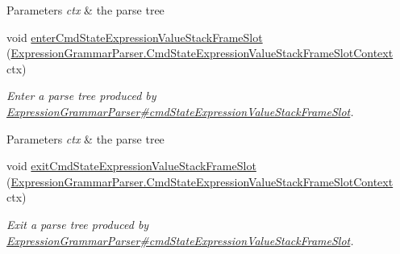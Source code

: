 \begin{DoxyCompactItemize}
\begin{DoxyCompactList}
\begin{DoxyParams}{Parameters}
{\em ctx} & the parse tree\\
\hline
\end{DoxyParams}
 \end{DoxyCompactList}\item 
void \hyperlink{classgov_1_1nasa_1_1jpf_1_1inspector_1_1server_1_1expression_1_1parser_1_1_expression_grammar_base_listener_a40f53b6e3ccedcc4bb7bbce628484466}{enter\+Cmd\+State\+Expression\+Value\+Stack\+Frame\+Slot} (\hyperlink{classgov_1_1nasa_1_1jpf_1_1inspector_1_1server_1_1expression_1_1parser_1_1_expression_grammar_pa53e28d24e840d016fb7c58b2b73008ab}{Expression\+Grammar\+Parser.\+Cmd\+State\+Expression\+Value\+Stack\+Frame\+Slot\+Context} ctx)
\begin{DoxyCompactList}\small\item\em Enter a parse tree produced by \hyperlink{classgov_1_1nasa_1_1jpf_1_1inspector_1_1server_1_1expression_1_1parser_1_1_expression_grammar_parser_a6b064d2ec6f62d4260a820ef3c1864e9}{Expression\+Grammar\+Parser\#cmd\+State\+Expression\+Value\+Stack\+Frame\+Slot}.


\begin{DoxyParams}{Parameters}
{\em ctx} & the parse tree\\
\hline
\end{DoxyParams}
 \end{DoxyCompactList}\item 
void \hyperlink{classgov_1_1nasa_1_1jpf_1_1inspector_1_1server_1_1expression_1_1parser_1_1_expression_grammar_base_listener_a3450e951a351afc75ba00ab7267f6bc8}{exit\+Cmd\+State\+Expression\+Value\+Stack\+Frame\+Slot} (\hyperlink{classgov_1_1nasa_1_1jpf_1_1inspector_1_1server_1_1expression_1_1parser_1_1_expression_grammar_pa53e28d24e840d016fb7c58b2b73008ab}{Expression\+Grammar\+Parser.\+Cmd\+State\+Expression\+Value\+Stack\+Frame\+Slot\+Context} ctx)
\begin{DoxyCompactList}\small\item\em Exit a parse tree produced by \hyperlink{classgov_1_1nasa_1_1jpf_1_1inspector_1_1server_1_1expression_1_1parser_1_1_expression_grammar_parser_a6b064d2ec6f62d4260a820ef3c1864e9}{Expression\+Grammar\+Parser\#cmd\+State\+Expression\+Value\+Stack\+Frame\+Slot}.



\end{DoxyCompactList}
\end{DoxyCompactItemize}
